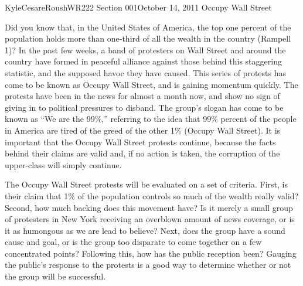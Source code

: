 \documentclass[12pt,letterpaper]{article}
\begin{document}
\begin{mla}{Kyle}{Cesare}{Roush}{WR222 Section 001}{October 14, 2011}{
Occupy Wall Street}

Did you know that, in the United States of America, the top one percent of the
population holds more than one-third of all the wealth in the country (Rampell
1)?  In the past few weeks, a band of protesters on Wall Street and around the
country have formed in peaceful alliance against those behind this staggering
statistic, and the supposed havoc they have caused.  This series of protests has
come to be known as Occupy Wall Street, and is gaining momentum quickly.  The
protests have been in the news for almost a month now, and show no sign of
giving in to political pressures to disband.  The group's slogan has come to be
known as ``We are the 99\%,'' referring to the idea that 99\% percent of the
people in America are tired of the greed of the other 1\% (Occupy Wall Street).
It is important that the Occupy Wall Street protests continue, because the facts
behind their claims are valid and, if no action is taken, the corruption of the
upper-class will simply continue.

The Occupy Wall Street protests will be evaluated on a set of criteria.  First,
is their claim that 1\% of the population controls so much of the wealth really
valid?  Second, how much backing does this movement have?  Is it merely a small
group of protesters in New York receiving an overblown amount of news coverage,
or is it as humongous as we are lead to believe?  Next, does the group have a
sound cause and goal, or is the group too disparate to come together on a few
concentrated points?  Following this, how has the public reception been?
Gauging the public's response to the protests is a good way to determine whether
or not the group will be successful.


\end{mla}
\end{document}
